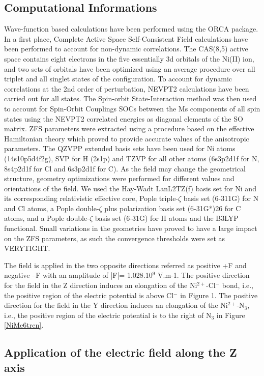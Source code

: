\documentclass[12pt]{report}
\numberwithin{equation}{section}
\begin{document}
\subsection{Computational Informations}
Wave-function based calculations have been performed using the ORCA package.
In a first place, Complete Active Space Self-Consistent Field calculations have been performed to account for non-dynamic correlations. 
The CAS(8,5) active space contains eight electrons in the five essentially 3d orbitals of the Ni(II) ion, and two sets of orbitals have been optimized using an average procedure over all triplet and all singlet states of the configuration.
To account for dynamic correlations at the 2nd order of perturbation, NEVPT2 calculations have been carried out for all states. 
The Spin-orbit State-Interaction method was then used to account for Spin-Orbit Couplings SOCs between the Ms components of all spin states using the NEVPT2 correlated energies as diagonal elements of the SO matrix. 
ZFS parameters were extracted using a procedure based on the effective Hamiltonian theory which proved to provide accurate values of the anisotropic parameters. 
The QZVPP extended basis sets have been used for Ni atoms (14s10p5d4f2g), SVP for H (2s1p) and TZVP for all other atoms (6s3p2d1f for N, 8s4p2d1f for Cl and 6s3p2d1f for C). 
As the field may change the geometrical structure, geometry optimizations were performed for different values and orientations of the field. 
We used the Hay-Wadt LanL2TZ(f) basis set for Ni and its corresponding relativistic effective core, Pople triple-$\zeta$ basis set (6-311G) for N and Cl atoms, a Pople double-$\zeta$ plus polarization basis set (6-31G*)26 for C atoms, and a Pople double-$\zeta$ basis set (6-31G) for H atoms and the B3LYP functional.
Small variations in the geometries have proved to have a large impact on the ZFS parameters, as such the convergence thresholds were set as VERYTIGHT.

The field is applied in the two opposite directions referred as positive +F and negative –F with an amplitude of |F|= 1.028.10$^9$ V.m-1.
The positive direction for the field in the Z direction induces an elongation of the Ni$^{2+}$-Cl$^-$ bond, i.e., the positive region of the electric potential is above Cl$^-$ in Figure 1. 
The positive direction for the field in the Y direction induces an elongation of the Ni$^{2+}$-N$_3$, i.e., the positive region of the electric potential is to the right of N$_3$ in Figure \ref{NiMe6tren}.

\subsection{Application of the electric field along the Z axis}
\end{document}
